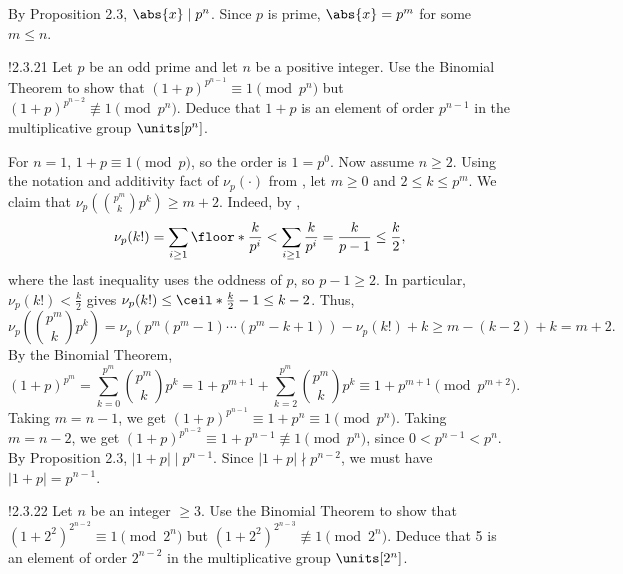 \begin{sol}
    By Proposition 2.3, $\abs{x} \mid p^n$.
    Since $p$ is prime, $\abs{x} = p^m$ for some $m \leq n$.
\end{sol}

\begin{exercise}!{2.3.21}
    Let $p$ be an odd prime and let $n$ be a positive integer.
	Use the Binomial Theorem to show that $(1 + p)^{p^{n - 1}} \equiv 1 \pmod{p^n}$ but $(1 + p)^{p^{n - 2}} \not\equiv 1 \pmod{p^n}$.
	Deduce that $1 + p$ is an element of order $p^{n - 1}$ in the multiplicative group $\units[p^n]$.
\end{exercise}

\begin{sol}
    For $n = 1$, $1 + p \equiv 1 \pmod{p}$, so the order is $1 = p^0$.
    Now assume $n \geq 2$.
    Using the notation and additivity fact of $\nu_p(\cdot)$ from , let $m \geq 0$ and $2 \leq k \leq p^m$.
    We claim that $\nu_p(\binom{p^m}{k} p^k) \geq m + 2$.
    Indeed, by ,
    \[
        \nu_p(k!) = \sum_{i \geq 1} \floor*{\frac{k}{p^i}} < \sum_{i \geq 1} \frac{k}{p^i} = \frac{k}{p - 1} \leq \frac{k}{2},
    \]
    where the last inequality uses the oddness of $p$, so $p - 1 \geq 2$.
    In particular, $\nu_p(k!) < \frac{k}{2}$ gives $\nu_p(k!) \leq \ceil*{\frac{k}{2}} - 1 \leq k - 2$.
    Thus,
    \[
        \nu_p\left(\binom{p^m}{k} p^k\right)
        = \nu_p(p^m (p^m - 1) \cdots (p^m - k + 1)) - \nu_p(k!) + k
        \geq m - (k - 2) + k
        = m + 2.
    \]
    By the Binomial Theorem,
    \[
        (1 + p)^{p^m} = \sum_{k = 0}^{p^m} \binom{p^m}{k} p^k = 1 + p^{m + 1} + \sum_{k = 2}^{p^m} \binom{p^m}{k} p^k \equiv 1 + p^{m + 1} \pmod{p^{m + 2}}.
    \]
    Taking $m = n - 1$, we get $(1 + p)^{p^{n - 1}} \equiv 1 + p^n \equiv 1 \pmod{p^n}$.
    Taking $m = n - 2$, we get $(1 + p)^{p^{n - 2}} \equiv 1 + p^{n - 1} \not\equiv 1 \pmod{p^n}$, since $0 < p^{n - 1} < p^n$.
    By Proposition 2.3, $|1 + p| \mid p^{n - 1}$.
    Since $|1 + p| \nmid p^{n - 2}$, we must have $|1 + p| = p^{n - 1}$.
\end{sol}

\begin{exercise}!{2.3.22}
    Let $n$ be an integer $\geq 3$.
	Use the Binomial Theorem to show that $(1 + 2^2)^{2^{n - 2}} \equiv 1 \pmod{2^n}$ but $(1 + 2^2)^{2^{n - 3}} \not\equiv 1 \pmod{2^n}$.
	Deduce that 5 is an element of order $2^{n - 2}$ in the multiplicative group $\units[2^n]$.
\end{exercise}

